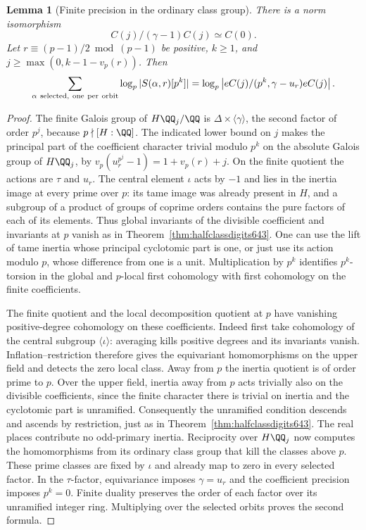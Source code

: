 \documentclass[a4paper,11pt]{article}
\newtheorem{lemma}[proposition]{Lemma}
\theoremstyle{definition}
\theoremstyle{remark}
\numberwithin{equation}{section}
\begin{document}
\begin{lemma}[Finite precision in the ordinary class group]
\leavevmode\label{lem:normmeasure647}
There is a norm isomorphism
\[
           C(j)/(\gamma-1)C(j)\simeq C(0).
\]
Let \(r\equiv(p-1)/2\bmod(p-1)\) be positive, \(k\ge1\),
and \(j\ge\max(0,k-1-v_p(r))\). Then
\[
 \sum_{\alpha\ {\rm selected,\ one\ per\ orbit}}
      \log_p |S(\alpha,r)[p^k]|
   =\log_p\left|eC(j)/(p^k,\gamma-u_r)eC(j)\right|.
\]
\end{lemma}
\begin{proof}
The finite Galois group of \(H\QQ_j/\QQ\) is
\(\Delta\times\langle\gamma\rangle\), the second factor
of order \(p^j\), because \(p\nmid[H:\QQ]\).
The indicated lower bound on \(j\) makes the principal part of
the coefficient character trivial modulo \(p^k\) on the
absolute Galois group of \(H\QQ_j\), by
\(v_p(u_r^{p^j}-1)=1+v_p(r)+j\).
On the finite quotient the actions are \(\tau\) and \(u_r\).
The central element \(\iota\) acts by \(-1\) and lies in the
inertia image at every prime over \(p\): its tame image was
already present in \(H\), and a subgroup of a product of groups
of coprime orders contains the pure factors of each of its
elements. Thus global invariants of the divisible coefficient
and invariants at \(p\) vanish as in
Theorem~\ref{thm:halfclassdigits643}. One can use the lift
of tame inertia whose principal cyclotomic part is one, or
just use its action modulo \(p\), whose difference from one is
a unit. Multiplication by \(p^k\) identifies \(p^k\)-torsion
in the global and \(p\)-local first cohomology with first
cohomology on the finite coefficients.

The finite quotient and the local decomposition quotient at
\(p\) have vanishing positive-degree cohomology on these
coefficients. Indeed first take cohomology of the central
subgroup \(\langle\iota\rangle\): averaging kills positive
degrees and its invariants vanish. Inflation--restriction
therefore gives the equivariant homomorphisms on the upper
field and detects the zero local class. Away from \(p\) the
inertia quotient is of order prime to \(p\). Over the upper
field, inertia away from \(p\) acts trivially also on the
divisible coefficients, since the finite character there
is trivial on inertia and the cyclotomic part is unramified.
Consequently the unramified condition descends and ascends
by restriction, just as in Theorem~\ref{thm:halfclassdigits643}.
The real places contribute no odd-primary inertia.
Reciprocity over \(H\QQ_j\) now computes the homomorphisms
from its ordinary class group that kill the classes above
\(p\). These prime classes are fixed by \(\iota\) and already
map to zero in every selected factor. In the \(\tau\)-factor,
equivariance imposes \(\gamma=u_r\) and the coefficient
precision imposes \(p^k=0\). Finite duality preserves the
order of each factor over its unramified integer ring.
Multiplying over the selected orbits proves the second formula.


\end{proof}
\end{document}
